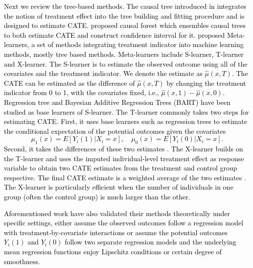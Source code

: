\documentclass[11pt,paper=letter]{scrartcl}
\newcommand\hz[1]{\textcolor{black}{#1}}
\begin{document}
\hz{Next we review the tree-based methods. The causal tree introduced in \cite{athey2015machine} integrates the notion of treatment effect into the tree building and fitting procedure and is designed to estimate CATE. \cite{wager2017estimation} proposed causal forest which ensembles causal trees to both estimate CATE and construct confidence interval for it. \cite{kunzel2017meta} proposed Meta-learners, a set of methods integrating treatment indicator into machine learning methods, mostly tree based methods. Meta-learners include S-learner, T-learner and X-learner. The S-learner is to estimate the observed outcome using all of the covariates and the treatment indicator. We denote the estimate as $\hat \mu (x,T)$. The CATE can be estimated as the difference of $\hat \mu (x,T)$ by changing the treatment indicator from 0 to 1, with the covariates fixed, i.e., $\hat \mu(x,1)  -  \hat \mu (x,0)$. Regression tree \cite{athey2015machine} and Bayesian Additive Regression Trees (BART) \cite{hill2011bart,green2012bart} have been studied as base learners of S-learner. The T-learner commonly takes two steps for estimating CATE. First, it uses base learners such as regression trees to estimate the conditional expectation of the potential outcomes given the covariates
$$
\mu_1 (x)  = E[ Y_i (1) | X_i = x], \quad \mu_0 (x)  = E[ Y_i (0) | X_i = x].
$$
Second, it takes the differences of these two estimates \cite{athey2015machine}. The X-learner builds on the T-learner and uses the imputed individual-level treatment effect as response variable to obtain two CATE estimates from the treatment and control group respective. The final CATE estimate is a weighted average of the two estimates \cite{kunzel2017meta}. The X-learner is particularly efficient when the number of individuals in one group (often the control group) is much larger than the other.}


\hz{Aforementioned work have also validated their methods theoretically under specific settings, either assume the observed outcomes follow a regression model with treatment-by-covariate interactions or assume the potential outcomes $Y_i(1)$ and $Y_i(0)$ follow two separate regression models and the underlying mean regression functions enjoy Lipschitz conditions or certain degree of smoothness.}
\end{document}
